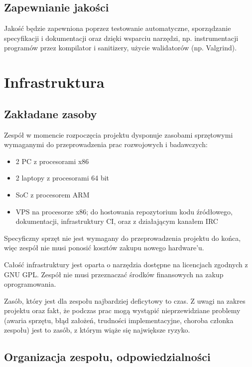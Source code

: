 \documentclass[11pt,oneside,a4paper,titlepage,onecolumn]{article}
\begin{document}
\subsection{Zapewnianie jakości}

Jakość  będzie zapewniona poprzez testowanie automatyczne, sporządzanie specyfikacji i dokumentacji 
oraz dzięki wsparciu narzędzi, np. instrumentacji programów przez kompilator i sanitizery, użycie walidatorów (np.
Valgrind).

\section{Infrastruktura}

\subsection{Zakładane zasoby}

Zespół w momencie rozpoczęcia projektu dysponuje zasobami sprzętowymi wymaganymi do przeprowadzenia prac
rozwojowych i badawczych:

\begin{itemize}
    \item 2 PC z procesorami x86
    \item 2 laptopy z procesorami 64 bit
    \item SoC z procesorem ARM
    \item VPS na procesorze x86; do hostowania repozytorium kodu źródłowego, dokumentacji, infrastruktury CI, oraz
        z działającym kanałem IRC
\end{itemize}

Specyficzny sprzęt nie jest wymagany do przeprowadzenia projektu do końca, więc zespół nie musi ponosić
kosztów zakupu nowego hardware'u.

Całość infrastruktury jest oparta o narzędzia dostępne na licencjach zgodnych z GNU GPL. Zespół nie musi
przeznaczać środków finansowych na zakup oprogramowania.

Zasób, który jest dla zespołu najbardziej deficytowy to czas. Z uwagi
na zakres projektu oraz fakt, że podczas prac mogą wystąpić nieprzewidziane problemy (awaria sprzętu, błąd
założeń, trudności implementacyjne, choroba członka zespołu) jest to zasób, z którym wiąże się największe
ryzyko.

\subsection{Organizacja zespołu, odpowiedzialności}
\end{document}
